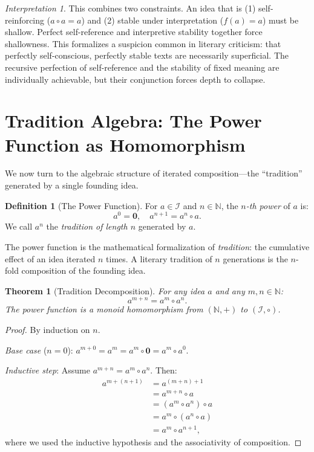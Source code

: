 \documentclass[11pt,openany]{book}
\theoremstyle{definition}
\newtheorem{definition}[axiom]{Definition}
\theoremstyle{plain}
\newtheorem{theorem}[axiom]{Theorem}
\theoremstyle{remark}
\newtheorem{interpretation}[axiom]{Interpretation}
\newcommand{\IS}{\mathcal{I}}               %
\newcommand{\compose}{\circ}                 %
\newcommand{\void}{\mathbf{0}}              %
\begin{document}
\begin{interpretation}
This combines two constraints. An idea that is (1) self-reinforcing ($a \compose a = a$) and (2) stable under interpretation ($f(a) = a$) must be shallow. Perfect self-reference and interpretive stability together force shallowness. This formalizes a suspicion common in literary criticism: that perfectly self-conscious, perfectly stable texts are necessarily superficial. The recursive perfection of self-reference and the stability of fixed meaning are individually achievable, but their conjunction forces depth to collapse.
\end{interpretation}

\section{Tradition Algebra: The Power Function as Homomorphism}

We now turn to the algebraic structure of iterated composition---the ``tradition'' generated by a single founding idea.

\begin{definition}[The Power Function]
For $a \in \IS$ and $n \in \mathbb{N}$, the \emph{$n$-th power} of $a$ is:
\[
a^0 = \void, \quad a^{n+1} = a^n \compose a.
\]
We call $a^n$ the \emph{tradition of length $n$} generated by $a$.
\end{definition}

The power function is the mathematical formalization of \emph{tradition}: the cumulative effect of an idea iterated $n$ times. A literary tradition of $n$ generations is the $n$-fold composition of the founding idea.

\begin{theorem}[Tradition Decomposition]
\label{thm:tradition-decomp}
For any idea $a$ and any $m, n \in \mathbb{N}$:
\[
a^{m+n} = a^m \compose a^n.
\]
The power function is a monoid homomorphism from $(\mathbb{N}, +)$ to $(\IS, \compose)$.
\end{theorem}

\begin{proof}
By induction on $n$.

\emph{Base case} ($n = 0$): $a^{m+0} = a^m = a^m \compose \void = a^m \compose a^0$.

\emph{Inductive step}: Assume $a^{m+n} = a^m \compose a^n$. Then:
\begin{align*}
a^{m+(n+1)} &= a^{(m+n)+1} \\
&= a^{m+n} \compose a \\
&= (a^m \compose a^n) \compose a \\
&= a^m \compose (a^n \compose a) \\
&= a^m \compose a^{n+1},
\end{align*}
where we used the inductive hypothesis and the associativity of composition.
\end{proof}
\end{document}
